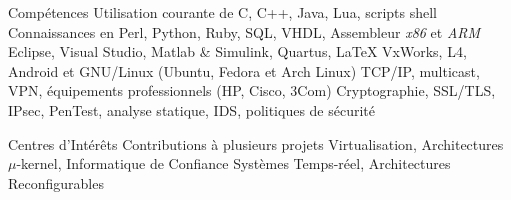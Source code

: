 \begin{supitemize}{Compétences}
		{
			Utilisation courante de C, C++, Java, Lua, scripts shell\newline
			Connaissances en Perl, Python, Ruby, SQL, VHDL, Assembleur \emph{x86} et \emph{ARM}
		}
		{Eclipse, Visual Studio, Matlab \& Simulink, Quartus, \LaTeX}
		{VxWorks, L4, Android et GNU/Linux (Ubuntu, Fedora et Arch Linux)}
		{TCP/IP, multicast, VPN, équipements professionnels (HP, Cisco, 3Com)}
		{Cryptographie, SSL/TLS, IPsec, PenTest, analyse statique, IDS, politiques de sécurité}
\end{supitemize}

\begin{supitemize}{Centres d'Intérêts}
		{Contributions à plusieurs projets}
		{Virtualisation, Architectures \ensuremath{\mu}-kernel, Informatique de Confiance}
		{Systèmes Temps-réel, Architectures Reconfigurables}
\end{supitemize}
